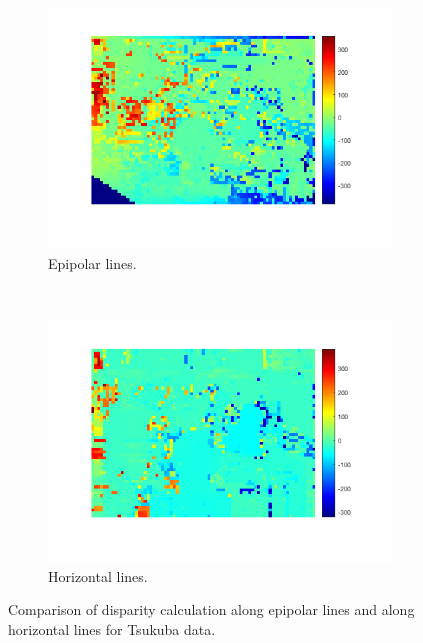 \documentclass[a4paper, 10pt, conference]{ieeeconf}
\begin{document}
\begin{figure}[!ht]
  \captionsetup[subfigure]{position=b}
  \centering
    \begin{subfigure}{0.45\linewidth}
      \includegraphics[width=\textwidth]{pic/q2_2_cd1_dis}
      \caption{Epipolar lines.}
      \label{fig:q2_2_cd1_tkb}
    \end{subfigure}
    ~
    \begin{subfigure}{0.45\linewidth}
      \includegraphics[width=\textwidth]{pic/q2_2_cd2_dis}
      \caption{Horizontal lines.}
      \label{fig:q2_2_cd3_tkb}
    \end{subfigure}

	\caption{Comparison of disparity calculation along epipolar lines and along horizontal lines for Tsukuba data. }
    \vspace{-0.5cm}
  \label{fig:q2_2_cd_tkb}
\end{figure}
\end{document}
